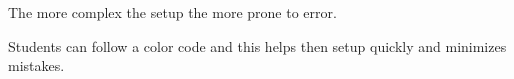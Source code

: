 The more complex the setup the more prone to error.
\bigskip

Students can follow a color code and this helps then setup quickly and minimizes mistakes.
\bigskip
